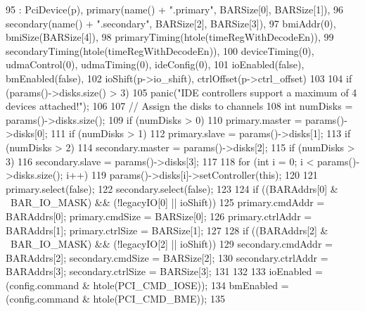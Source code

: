 \begin{DoxyCode}
95     : PciDevice(p), primary(name() + ".primary", BARSize[0], BARSize[1]),
96     secondary(name() + ".secondary", BARSize[2], BARSize[3]),
97     bmiAddr(0), bmiSize(BARSize[4]),
98     primaryTiming(htole(timeRegWithDecodeEn)),
99     secondaryTiming(htole(timeRegWithDecodeEn)),
100     deviceTiming(0), udmaControl(0), udmaTiming(0), ideConfig(0),
101     ioEnabled(false), bmEnabled(false),
102     ioShift(p->io_shift), ctrlOffset(p->ctrl_offset)
103 {
104     if (params()->disks.size() > 3)
105         panic("IDE controllers support a maximum of 4 devices attached!\n");
106 
107     // Assign the disks to channels
108     int numDisks = params()->disks.size();
109     if (numDisks > 0)
110         primary.master = params()->disks[0];
111     if (numDisks > 1)
112         primary.slave = params()->disks[1];
113     if (numDisks > 2)
114         secondary.master = params()->disks[2];
115     if (numDisks > 3)
116         secondary.slave = params()->disks[3];
117 
118     for (int i = 0; i < params()->disks.size(); i++) {
119         params()->disks[i]->setController(this);
120     }
121     primary.select(false);
122     secondary.select(false);
123 
124     if ((BARAddrs[0] & ~BAR_IO_MASK) && (!legacyIO[0] || ioShift)) {
125         primary.cmdAddr = BARAddrs[0];  primary.cmdSize = BARSize[0];
126         primary.ctrlAddr = BARAddrs[1]; primary.ctrlSize = BARSize[1];
127     }
128     if ((BARAddrs[2] & ~BAR_IO_MASK) && (!legacyIO[2] || ioShift)) {
129         secondary.cmdAddr = BARAddrs[2];  secondary.cmdSize = BARSize[2];
130         secondary.ctrlAddr = BARAddrs[3]; secondary.ctrlSize = BARSize[3];
131     }
132 
133     ioEnabled = (config.command & htole(PCI_CMD_IOSE));
134     bmEnabled = (config.command & htole(PCI_CMD_BME));
135 }
\end{DoxyCode}


